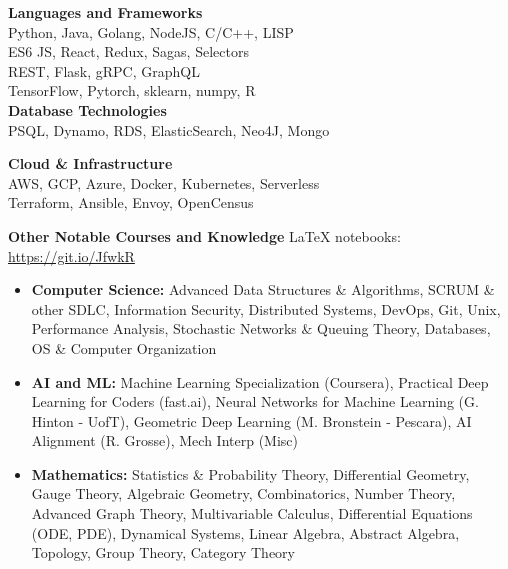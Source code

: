 \documentclass{article}
\newcommand{\centerbullet}{$\vcenter{\hbox{\tiny$\bullet$}} \ $}
\begin{document}
\begin{centering}
\vspace{-8pt}
\begin{multicols}{2}
{\bf Languages and Frameworks}\\
Python, Java, Golang, NodeJS, C/C++, LISP\\
ES6 JS, React, Redux, Sagas, Selectors \\
REST, Flask, gRPC, GraphQL  \\   
TensorFlow, Pytorch, sklearn, numpy, R\\
{ \bf Database Technologies}\\
PSQL, Dynamo, RDS, ElasticSearch, Neo4J, Mongo

{\bf Cloud \& Infrastructure }\\
AWS, GCP, Azure, Docker, Kubernetes, Serverless \\
Terraform, Ansible, Envoy, OpenCensus
\end{multicols}
\end{centering}
\vspace{-3pt}
{\bf Other Notable Courses and Knowledge} \hfill \LaTeX \hspace{1pt} notebooks: \url{https://git.io/JfwkR} 
\begin{itemize}[leftmargin=*]
\itemsep0em
\renewcommand\labelitemi{\tiny$\bullet$}
    \item {\footnotesize {\bf{Computer Science:}} Advanced Data Structures \& Algorithms, SCRUM \& other SDLC, Information Security, Distributed Systems, DevOps, Git, Unix, Performance Analysis, Stochastic Networks \& Queuing Theory, Databases, OS \& Computer Organization}
    \item {\footnotesize  \textbf{AI and ML:} Machine Learning Specialization (Coursera), Practical Deep Learning for Coders (fast.ai), Neural Networks for Machine Learning (G. Hinton - UofT), Geometric Deep Learning (M. Bronstein - Pescara), AI Alignment (R. Grosse), Mech Interp (Misc)}
    \item {\footnotesize  {\bf{Mathematics:}} Statistics \& Probability Theory, Differential Geometry, Gauge Theory, Algebraic Geometry, Combinatorics, Number Theory, Advanced Graph Theory, Multivariable Calculus, Differential Equations (ODE, PDE), Dynamical Systems, Linear Algebra, Abstract Algebra, Topology, Group Theory, Category Theory}
\end{itemize}

\end{document}
